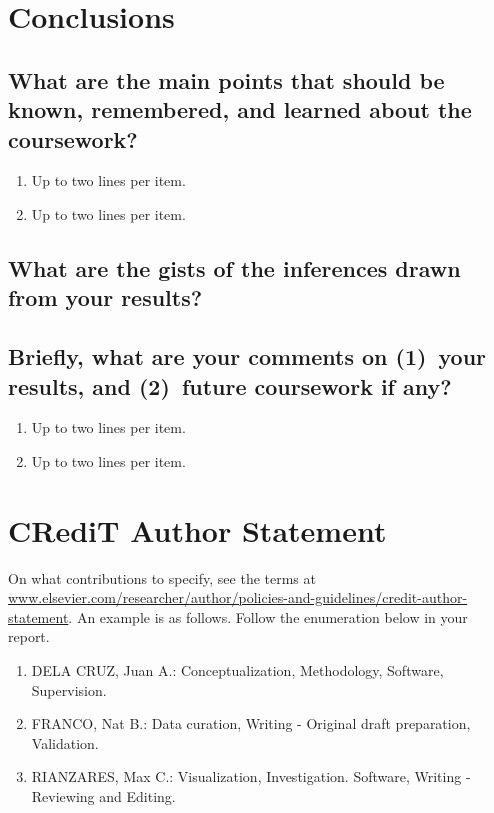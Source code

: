 \section{Conclusions}
\label{sec:conc}

\subsection{What are the main points that should be known, remembered, and learned about the coursework?}
\begin{enumerate}
\item Up to two lines per item.
\item Up to two lines per item.
\end{enumerate}

\subsection{What are the gists of the inferences drawn from your results?}

\subsection{Briefly, what are your comments on (1)~your results, and  (2)~future coursework if any?}
\begin{enumerate}
\item Up to two lines per item.
\item Up to two lines per item.
\end{enumerate}	



\section{CRediT Author Statement}

On what contributions to specify, see the terms at \url{www.elsevier.com/researcher/author/policies-and-guidelines/credit-author-statement}.  An example is as follows.  Follow the enumeration below in your report.

\begin{enumerate}
	\item DELA CRUZ, Juan A.: Conceptualization, Methodology, Software, Supervision.
	
	\item FRANCO, Nat B.: Data curation, Writing - Original draft preparation, Validation.
	
	\item RIANZARES, Max C.: Visualization, Investigation. Software, Writing - Reviewing and Editing.
\end{enumerate}



